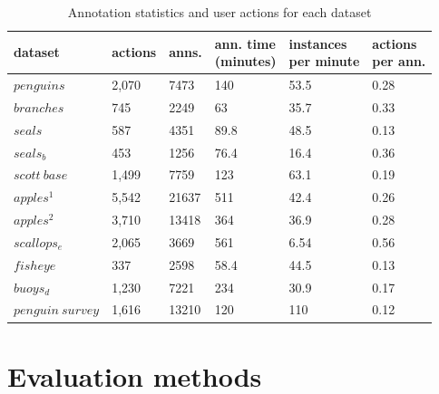 \begin{table}[]
\centering
\caption{ Annotation statistics and user actions for each dataset }
\label{fig:annotation_table}
\begin{tabular}{llllll}
dataset           & actions & anns. & \shortstack {ann. time \\ (minutes)} & \shortstack{instances \\ per minute} & \shortstack{actions \\ per ann.} \\
\toprule
$penguins$        & 2,070   & 7473        & 140                       & 53.5                 & 0.28                   \\
$branches$        & 745     & 2249        & 63                        & 35.7                 & 0.33                   \\
$seals$           & 587     & 4351        & 89.8                      & 48.5                 & 0.13                   \\
$seals_b$         & 453     & 1256        & 76.4                      & 16.4                 & 0.36                   \\
$scott\:base$     & 1,499   & 7759        & 123                       & 63.1                 & 0.19                   \\
$apples^1$        & 5,542   & 21637       & 511                       & 42.4                 & 0.26                   \\
$apples^2$        & 3,710   & 13418       & 364                       & 36.9                 & 0.28                   \\
$scallops_e$      & 2,065   & 3669        & 561                       & 6.54                 & 0.56                   \\
$fisheye$         & 337     & 2598        & 58.4                      & 44.5                 & 0.13                   \\
$buoys_d$         & 1,230   & 7221        & 234                       & 30.9                 & 0.17                   \\
$penguin\:survey$ & 1,616   & 13210       & 120                       & 110                  & 0.12                  \\
\bottomrule
\end{tabular}
\end{table}



\section {Evaluation methods}
\label{sec:ann_evaluation}


